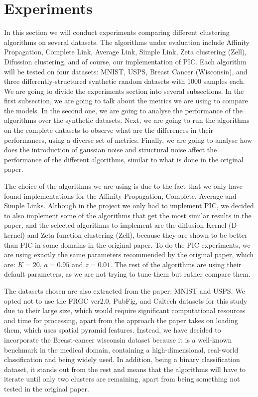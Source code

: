 \documentclass[
	10pt,
	parskip=half-,	
	paper=a4,
	english
	]{scrartcl}
\begin{document}
\section {Experiments}

In this section we will conduct experiments comparing different clustering algorithms on several datasets. The algorithms under evaluation include Affinity Propagation, Complete Link, Average Link, Simple Link, Zeta clustering (Zell), Difussion clustering, and of course, our implementation of PIC. Each algorithm will be tested on four datasets: MNIST, USPS, Breast Cancer (Wisconsin), and three differently-structured synthetic random datasets with 1000 samples each. We are going to divide the experiments section into several subsections. In the first subsection, we are going to talk about the metrics we are using to compare the models. In the second one, we are going to analyse the performance of the algorithms over the synthetic datasets. Next, we are going to run the algorithms on the complete datasets to observe what are the differences in their performances, using a diverse set of metrics. Finally, we are going to analyse how does the introduction of gaussian noise and structural noise affect the performance of the different algorithms, similar to what is done in the original paper.

The choice of the algorithms we are using is due to the fact that we only have found implementations for the Affinity Propagation, Complete, Average and Simple Links. Although in the project we only had to implement PIC, we decided to also implement some of the algorithms that get the most similar results in the paper, and the selected algorithms to implement are the diffusion Kernel (D-kernel) and Zeta function clustering (Zell), because they are shown to be better than PIC in some domains in the original paper. To do the PIC experiments, we are using exactly the same parameters recommended by the original paper, which are: \(K=20\), \(a=0.95\) and \(z=0.01\). The rest of the algorithms are using their default parameters, as we are not trying to tune them but rather compare them.

The datasets chosen are also extracted from the paper: MNIST and USPS. We opted not to use the FRGC ver2.0, PubFig, and Caltech datasets for this study due to their large size, which would require significant computational resources and time for processing, apart from the approach the paper takes on loading them, which uses spatial pyramid features. Instead, we have decided to incorporate the Breast-cancer wisconsin dataset because it is a well-known benchmark in the medical domain, containing a high-dimensional, real-world classification and being widely used. In addition, being a binary classification dataset, it stands out from the rest and means that the algorithms will have to iterate until only two clusters are remaining, apart from being something not tested in the original paper.
\end{document}
